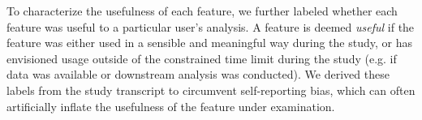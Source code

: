To characterize the usefulness 
of each feature, 
we further labeled whether each 
feature was useful to a particular user's analysis. 
A feature is deemed \textit{useful} 
if the feature was either used in a sensible 
and meaningful way during the study, 
or has envisioned usage outside of the constrained 
time limit during the study 
(e.g. if data was available or downstream analysis was conducted). 
We derived these labels from the study transcript 
to circumvent self-reporting bias, 
which can often artificially inflate 
the usefulness of the feature under examination. 
